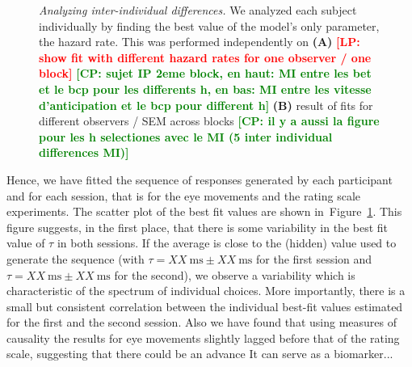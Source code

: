 \documentclass[12pt,english]{article}%
\newcommand{\ms}{\si{\milli\second}}%
\newcommand{\seeFig}[1]{Figure~\ref{fig:#1}}
\newcommand{\LP}[1]{\textbf{\textcolor{red}{[LP: #1]}}}
\newcommand{\AM}[1]{\textbf{\textcolor{blue}{[AM: #1]}}}
\newcommand{\CP}[1]{\textbf{\textcolor{green}{[CP: #1]}}}
\begin{document}
\begin{figure}%
\caption{\emph{Analyzing inter-individual differences.} %
We analyzed each subject individually by finding the best value of the model's only parameter, the hazard rate.
This was performed independently on 
\textbf{(A)}
\LP{ show fit with different hazard rates for one observer / one block}
\CP{sujet IP 2eme block,  en haut: MI entre les bet et le bcp pour les differents h, en bas: MI entre les vitesse d'anticipation et le bcp pour different h}
\textbf{(B)}
result of fits for different observers / SEM across blocks
\CP{il y a aussi la figure pour les h selectiones avec le MI (5 inter individual differences MI)}
}
\label{fig:results_inter}
\end{figure}
Hence, we have fitted the sequence of responses generated by each participant and
for each session, that is for the eye movements and the rating scale experiments.
The scatter plot of the best fit values are shown in~\seeFig{results_inter}.
This figure suggests, in the first place, that there is some variability in the best fit value of $\tau$
in both sessions.
If the average is close to the (hidden) value used to generate the sequence
(with $\tau = XX~\ms \pm XX~\ms$ for the first session and
 $\tau = XX~\ms \pm XX~\ms$ for the second),
 we observe a variability which is characteristic of the spectrum of individual choices.
More importantly, there is a small but consistent
correlation between the individual best-fit values estimated for the first and the second session.
Also we have found that using measures of causality %
the results for eye movements slightly lagged before
that of the rating scale,
suggesting that there could be an advance
It can serve as a biomarker...
\end{document}

